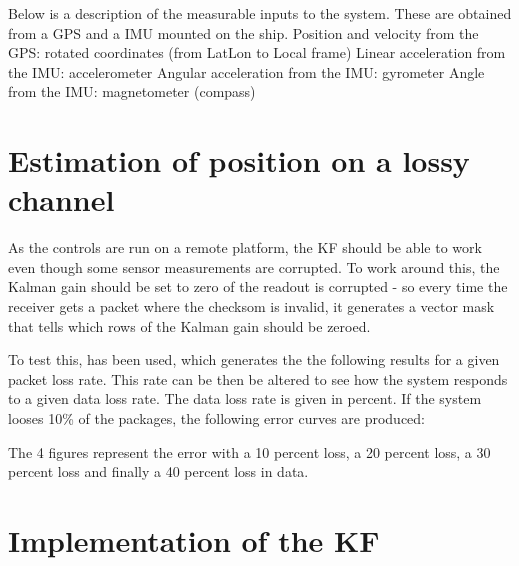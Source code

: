 Below is a description of the measurable inputs to the system. These are obtained from a \ac{GPS} and a \ac{IMU} mounted on the ship.
Position and velocity from the \ac{GPS}: rotated coordinates (from LatLon to Local frame)
Linear acceleration from the \ac{IMU}: accelerometer
Angular acceleration from the \ac{IMU}: gyrometer
Angle from the \ac{IMU}: magnetometer (compass)

\section{Estimation of position on a lossy channel}
As the controls are run on a remote platform, the \ac{KF} should be able to work even though some sensor measurements are corrupted. To work around this, the Kalman gain should be set to zero of the readout is corrupted - so every time the receiver gets a packet where the checksom is invalid, it generates a vector mask that tells which rows of the Kalman gain should be zeroed. 

To test this, \MATLAB has been used, which generates the the following results for a given packet loss rate. This rate can be then be altered to see how the system responds to a given data loss rate. The data loss rate is given in percent. If the system looses 10\% of the packages, the following error curves are produced:

The 4 figures represent the error with a 10 percent loss, a 20 percent loss, a 30 percent loss and finally a 40 percent loss in data. 

\section{Implementation of the \ac{KF}}
